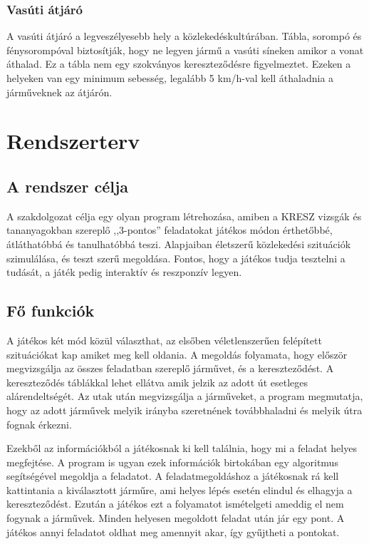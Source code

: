 \documentclass[
]{thesis-ekf}
\theoremstyle{definition}
\theoremstyle{remark}
\begin{document}
\subsection{Vasúti átjáró}
A vasúti átjáró a legveszélyesebb hely a közlekedéskultúrában. Tábla, sorompó és fénysorompóval biztosítják, hogy ne legyen jármű a vasúti síneken amikor a vonat áthalad. Ez a tábla nem egy szokványos kereszteződésre figyelmeztet. Ezeken a helyeken van egy minimum sebesség, legalább 5 km/h-val kell áthaladnia a járműveknek az átjárón.
\cite{kresz_tabla}

 

\chapter{Rendszerterv}

\section{A rendszer célja}
A szakdolgozat célja egy olyan program létrehozása, amiben a KRESZ vizsgák és tananyagokban szereplő ,,3-pontos'' feladatokat játékos módon érthetőbbé, átláthatóbbá és tanulhatóbbá teszi. Alapjaiban életszerű közlekedési szituációk szimulálása, és teszt szerű megoldása.  Fontos, hogy a játékos tudja tesztelni a tudását, a játék pedig interaktív és reszponzív legyen. 
\section{Fő funkciók}
A játékos két mód közül választhat, az elsőben véletlenszerűen felépített szituációkat kap amiket meg kell oldania. A megoldás folyamata, hogy először megvizsgálja az összes feladatban szereplő járművet, és a kereszteződést. A kereszteződés táblákkal lehet ellátva amik jelzik az adott út esetleges alárendeltségét. Az utak után megvizsgálja a járműveket, a program megmutatja, hogy az adott járművek melyik irányba szeretnének továbbhaladni és melyik útra fognak érkezni.

Ezekből az információkból a játékosnak ki kell találnia, hogy mi a feladat helyes megfejtése. A program is ugyan ezek információk birtokában egy algoritmus segítségével megoldja a feladatot. A feladatmegoldáshoz a játékosnak rá kell kattintania a kiválasztott járműre, ami helyes lépés esetén elindul és elhagyja a kereszteződést. Ezután a játékos ezt a folyamatot ismételgeti ameddig el nem fogynak a járművek. Minden helyesen megoldott feladat után jár egy pont. A játékos annyi feladatot oldhat meg amennyit akar, így gyűjtheti a pontokat.
\end{document}
